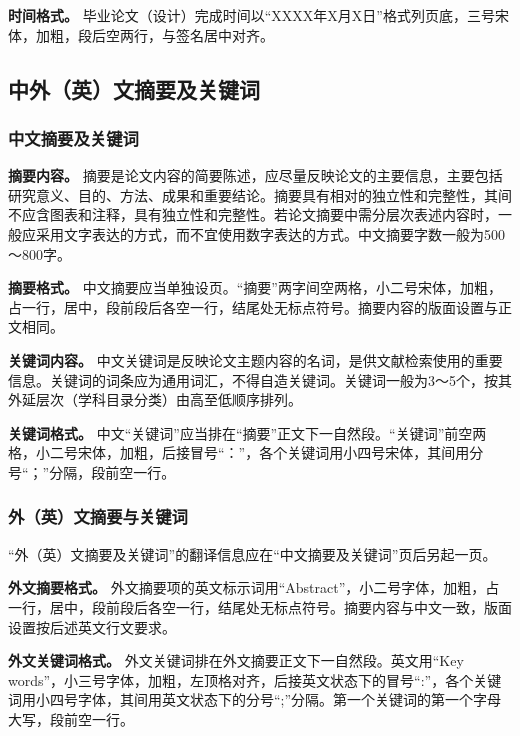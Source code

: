 \documentclass[singlesided]{Style/ucasthesis}%
\begin{document}
\textbf{时间格式。} 毕业论文（设计）完成时间以``XXXX年X月X日''格式列页底，三号宋体，加粗，段后空两行，与签名居中对齐。

\hypertarget{section-14}{%
\subsection{中外（英）文摘要及关键词}\label{section-14}}

\hypertarget{section-15}{%
\subsubsection{中文摘要及关键词}\label{section-15}}

\textbf{摘要内容。} 摘要是论文内容的简要陈述，应尽量反映论文的主要信息，主要包括研究意义、目的、方法、成果和重要结论。摘要具有相对的独立性和完整性，其间不应含图表和注释，具有独立性和完整性。若论文摘要中需分层次表述内容时，一般应采用文字表达的方式，而不宜使用数字表达的方式。中文摘要字数一般为500～800字。

\textbf{摘要格式。} 中文摘要应当单独设页。``摘要''两字间空两格，小二号宋体，加粗，占一行，居中，段前段后各空一行，结尾处无标点符号。摘要内容的版面设置与正文相同。

\textbf{关键词内容。} 中文关键词是反映论文主题内容的名词，是供文献检索使用的重要信息。关键词的词条应为通用词汇，不得自造关键词。关键词一般为3～5个，按其外延层次（学科目录分类）由高至低顺序排列。

\textbf{关键词格式。} 中文``关键词''应当排在``摘要''正文下一自然段。``关键词''前空两格，小二号宋体，加粗，后接冒号``：''，各个关键词用小四号宋体，其间用分号``；''分隔，段前空一行。

\hypertarget{section-16}{%
\subsubsection{外（英）文摘要与关键词}\label{section-16}}

``外（英）文摘要及关键词''的翻译信息应在``中文摘要及关键词''页后另起一页。

\textbf{外文摘要格式。} 外文摘要项的英文标示词用``Abstract''，小二号字体，加粗，占一行，居中，段前段后各空一行，结尾处无标点符号。摘要内容与中文一致，版面设置按后述英文行文要求。

\textbf{外文关键词格式。} 外文关键词排在外文摘要正文下一自然段。英文用``Key words''，小三号字体，加粗，左顶格对齐，后接英文状态下的冒号``:''，各个关键词用小四号字体，其间用英文状态下的分号``;''分隔。第一个关键词的第一个字母大写，段前空一行。
\end{document}
